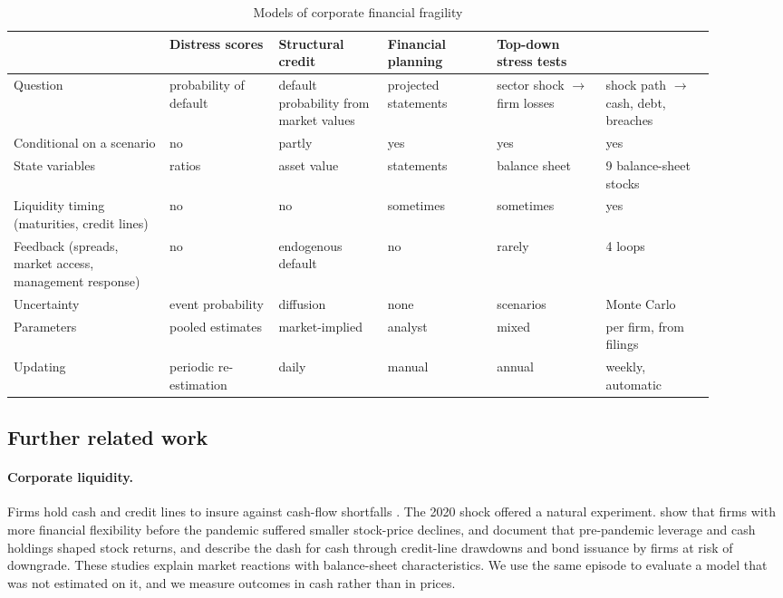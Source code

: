 \begin{table}[t]
\centering\scriptsize
\setlength{\tabcolsep}{3pt}
\caption{Models of corporate financial fragility}
\label{tab:framework}
\begin{tabular}{p{0.2\linewidth}p{0.14\linewidth}p{0.14\linewidth}p{0.14\linewidth}p{0.14\linewidth}p{0.14\linewidth}}
\toprule
 & Distress scores & Structural credit & Financial planning & Top-down stress tests & \twin{} \\
\midrule
Question & probability of default & default probability from market values & projected statements & sector shock $\rightarrow$ firm losses & shock path $\rightarrow$ cash, debt, breaches \\
Conditional on a scenario & no & partly & yes & yes & yes \\
State variables & ratios & asset value & statements & balance sheet & 9 balance-sheet stocks \\
Liquidity timing (maturities, credit lines) & no & no & sometimes & sometimes & yes \\
Feedback (spreads, market access, management response) & no & endogenous default & no & rarely & 4 loops \\
Uncertainty & event probability & diffusion & none & scenarios & Monte Carlo \\
Parameters & pooled estimates & market-implied & analyst & mixed & per firm, from filings \\
Updating & periodic re-estimation & daily & manual & annual & weekly, automatic \\
\bottomrule
\end{tabular}
\end{table}

\subsection{Further related work}
\paragraph{Corporate liquidity.} Firms hold cash and credit lines to insure against cash-flow shortfalls \citep{opler1999,almeida2004,bates2009,sufi2009}. The 2020 shock offered a natural experiment. \citet{fahlenbrach2021} show that firms with more financial flexibility before the pandemic suffered smaller stock-price declines, \citet{ramelli2020} and \citet{ding2021} document that pre-pandemic leverage and cash holdings shaped stock returns, and \citet{acharya2020} describe the dash for cash through credit-line drawdowns and bond issuance by firms at risk of downgrade. These studies explain market reactions with balance-sheet characteristics. We use the same episode to evaluate a model that was not estimated on it, and we measure outcomes in cash rather than in prices.

